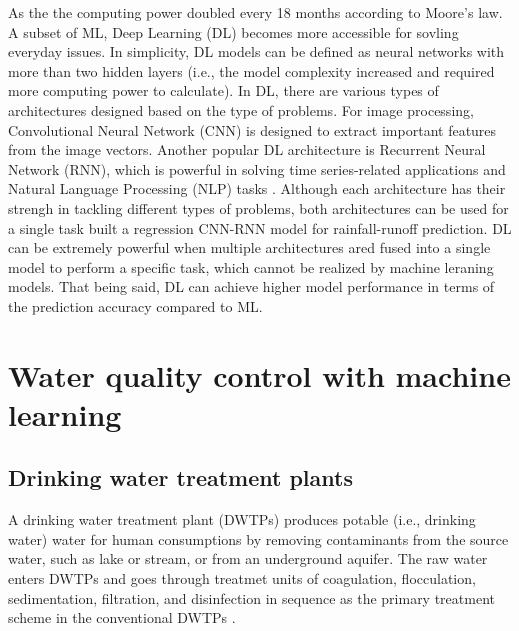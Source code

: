 As the the computing power doubled every 18 months according to Moore's law. A subset of ML, Deep Learning (DL) becomes more accessible for sovling everyday issues. In simplicity, DL models can be defined as neural networks with more than two hidden layers (i.e., the model complexity increased and required more computing power to calculate). In DL, there are various types of architectures designed based on the type of problems. For image processing, Convolutional Neural Network (CNN) is designed to extract important features from the image vectors. Another popular DL architecture is Recurrent Neural Network (RNN), which is powerful in solving time series-related applications and Natural Language Processing (NLP) tasks \citep{liERNNDesignOptimization2018}. Although each architecture has their strengh in tackling different types of problems, both architectures can be used for a single task \citet{liPredictionFlowBased2022} built a regression CNN-RNN model for rainfall-runoff prediction. DL can be extremely powerful when multiple architectures ared fused into a single model to perform a specific task, which cannot be realized by machine leraning models. That being said, DL can achieve higher model performance in terms of the prediction accuracy compared to ML. 

\section{Water quality control with machine learning}
\subsection{Drinking water treatment plants}
A drinking water treatment plant (DWTPs) produces potable (i.e., drinking water) water for human consumptions by removing contaminants from the source water, such as lake or stream, or from an underground aquifer. The raw water enters DWTPs and goes through treatmet units of coagulation, flocculation, sedimentation, filtration, and disinfection in sequence as the primary treatment scheme in the conventional DWTPs \citep{liRecentAdvancesArtificial2021}. 

